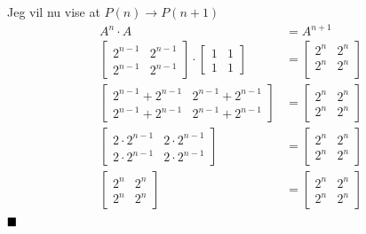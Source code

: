 \documentclass[a4paper,10pt]{article}
\begin{document}
Jeg vil nu vise at $P(n) \rightarrow P(n+1)$\\\begin{align*}
A^n\cdot A &= A^{n+1}\\
\begin{bmatrix}
2^{n-1}&2^{n-1}\\2^{n-1}&2^{n-1}
\end{bmatrix} \cdot \begin{bmatrix}
1&1\\1&1
\end{bmatrix} &= \begin{bmatrix}
2^n&2^n\\2^n&2^n\\
\end{bmatrix}\\
\begin{bmatrix}
2^{n-1}+2^{n-1}&2^{n-1}+2^{n-1}\\2^{n-1}+2^{n-1}&2^{n-1}+2^{n-1}
\end{bmatrix} &= \begin{bmatrix}
2^n&2^n\\2^n&2^n
\end{bmatrix}\\
\begin{bmatrix}
2\cdot 2^{n-1}&2\cdot 2^{n-1}\\2\cdot 2^{n-1}&2\cdot 2^{n-1}
\end{bmatrix}&= \begin{bmatrix}
2^n&2^n\\2^n&2^n
\end{bmatrix}\\
\begin{bmatrix}
2^n&2^n\\2^n&2^n
\end{bmatrix}&= \begin{bmatrix}
2^n&2^n\\2^n&2^n
\end{bmatrix}\\
\end{align*}
$\hfill\blacksquare
$
\end{document}
